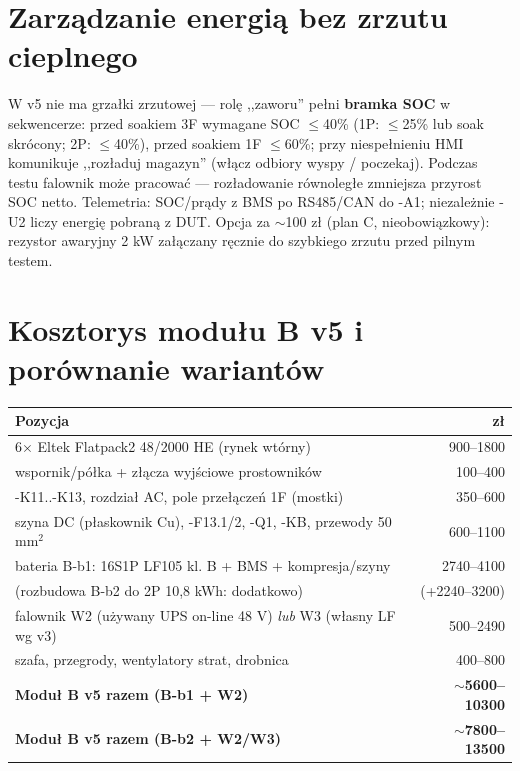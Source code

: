 \documentclass[11pt,a4paper]{article}
\begin{document}
\section{Zarządzanie energią bez zrzutu cieplnego}
\label{sec:soc}
W v5 nie ma grzałki zrzutowej --- rolę ,,zaworu'' pełni \textbf{bramka SOC} w sekwencerze:
przed soakiem 3F wymagane SOC $\le$40\% (1P: $\le$25\% lub soak skrócony; 2P: $\le$40\%),
przed soakiem 1F $\le$60\%; przy niespełnieniu HMI komunikuje ,,rozładuj magazyn'' (włącz odbiory
wyspy / poczekaj). Podczas testu falownik może pracować --- rozładowanie równoległe zmniejsza
przyrost SOC netto. Telemetria: SOC/prądy z BMS po RS485/CAN do -A1; niezależnie -U2 liczy energię
pobraną z DUT. Opcja za $\sim$100 zł (plan C, nieobowiązkowy): rezystor awaryjny 2 kW załączany
ręcznie do szybkiego zrzutu przed pilnym testem.

\section{Kosztorys modułu B v5 i porównanie wariantów}
\begin{longtable}{@{}p{}r@{}}
\toprule
\textbf{Pozycja} & \textbf{zł}\\
\midrule
6$\times$ Eltek Flatpack2 48/2000 HE (rynek wtórny) & 900--1800\\
wspornik/półka + złącza wyjściowe prostowników & 100--400\\
-K11..-K13, rozdział AC, pole przełączeń 1F (mostki) & 350--600\\
szyna DC (płaskownik Cu), -F13.1/2, -Q1, -KB, przewody 50 mm$^2$ & 600--1100\\
bateria B-b1: 16S1P LF105 kl. B + BMS + kompresja/szyny & 2740--4100\\
\quad (rozbudowa B-b2 do 2P 10,8 kWh: dodatkowo) & (+2240--3200)\\
falownik W2 (używany UPS on-line 48 V) \emph{lub} W3 (własny LF wg v3) & 500--2490\\
szafa, przegrody, wentylatory strat, drobnica & 400--800\\
\midrule
\textbf{Moduł B v5 razem (B-b1 + W2)} & \textbf{$\sim$5600--10300}\\
\textbf{Moduł B v5 razem (B-b2 + W2/W3)} & \textbf{$\sim$7800--13500}\\
\bottomrule
\end{longtable}
\end{document}
